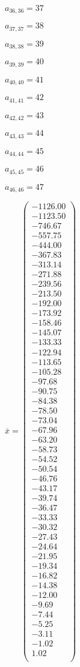 \documentclass[a4paper,12pt]{article}
\begin{document}
$a _{ 36, 36 } = 37$

$a _{ 37, 37 } = 38$

$a _{ 38, 38 } = 39$

$a _{ 39, 39 } = 40$

$a _{ 40, 40 } = 41$

$a _{ 41, 41 } = 42$

$a _{ 42, 42 } = 43$

$a _{ 43, 43 } = 44$

$a _{ 44, 44 } = 45$

$a _{ 45, 45 } = 46$

$a _{ 46, 46 } = 47$

$\bar { x } = \begin{pmatrix}
-1126.00 \\
-1123.50 \\
-746.67 \\
-557.75 \\
-444.00 \\
-367.83 \\
-313.14 \\
-271.88 \\
-239.56 \\
-213.50 \\
-192.00 \\
-173.92 \\
-158.46 \\
-145.07 \\
-133.33 \\
-122.94 \\
-113.65 \\
-105.28 \\
-97.68 \\
-90.75 \\
-84.38 \\
-78.50 \\
-73.04 \\
-67.96 \\
-63.20 \\
-58.73 \\
-54.52 \\
-50.54 \\
-46.76 \\
-43.17 \\
-39.74 \\
-36.47 \\
-33.33 \\
-30.32 \\
-27.43 \\
-24.64 \\
-21.95 \\
-19.34 \\
-16.82 \\
-14.38 \\
-12.00 \\
-9.69 \\
-7.44 \\
-5.25 \\
-3.11 \\
-1.02 \\
1.02 \\
\end{pmatrix}
$
\end{document}
